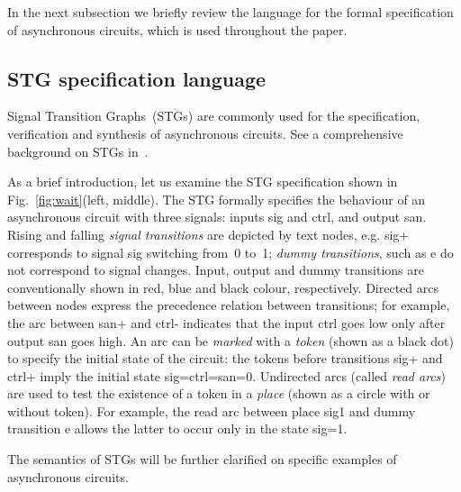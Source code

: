 \documentclass[conference]{IEEEtran}
\begin{document}

In the next subsection we briefly review the language for the formal specification
of asynchronous circuits, which is used throughout the paper.

\subsection*{STG specification language}\label{sec-stg}

Signal Transition Graphs~(STGs) are commonly used for the specification,
verification and synthesis of asynchronous circuits. See a comprehensive
background on STGs in~\cite{2002_cortadella_book}.

As a brief introduction, let us examine the STG specification shown in
Fig.~\ref{fig:wait}(left, middle). The STG formally specifies the behaviour
of an asynchronous circuit with three signals: inputs \textsf{sig} and \textsf{ctrl},
and output \textsf{san}. Rising and falling \emph{signal transitions} are depicted by text
nodes, e.g. \textsf{sig+} corresponds to signal \textsf{sig} switching from~0 to~1;
\emph{dummy transitions}, such as \textsf{e} do not correspond to signal changes.
Input, output and dummy transitions are conventionally shown in red, blue and black
colour, respectively. Directed arcs between nodes express the precedence relation
between transitions; for example, the arc between \textsf{san+} and \textsf{ctrl-} indicates
that the input \textsf{ctrl} goes low only after output \textsf{san} goes high.
An arc can be \emph{marked} with a \emph{token} (shown as a black dot) to specify
the initial state of the circuit: the tokens before transitions \textsf{sig+} and
\textsf{ctrl+} imply the initial state \textsf{sig=ctrl=san=0}. Undirected arcs (called
\emph{read arcs}) are used to test the existence of a token in a \emph{place} (shown as
a circle with or without token). For example, the read arc between place \textsf{sig1}
and dummy transition \textsf{e} allows the latter to occur only in the state \textsf{sig=1}.

The semantics of STGs will be further clarified on specific examples of asynchronous
circuits.

\end{document}
